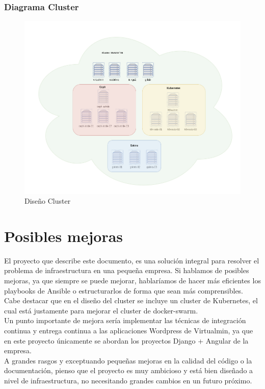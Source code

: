 \begin{paragraph}
		\subsubsection{Diagrama Cluster}
			\begin{figure}[!hbt]
				\centering
				\includegraphics[scale=0.39]{imagenes/Diseno/diagrama_cluster_2.png}
				\caption[Diseño Cluster]{Diseño Cluster} 
				\label{cluster_design}
			\end{figure}
		
	\end{paragraph}
		
\section{Posibles mejoras}
	\begin{paragraph}
		El proyecto que describe este documento, es una solución integral para resolver el problema de infraestructura en una pequeña empresa. Si hablamos de posibles mejoras, ya que siempre se puede mejorar, hablaríamos de hacer más eficientes los playbooks de Ansible o estructurarlos de forma que sean más comprensibles. Cabe destacar que en el diseño del cluster se incluye un cluster de Kubernetes, el cual está justamente para mejorar el cluster de docker-swarm. \\
		Un punto importante de mejora sería implementar las técnicas de integración continua y entrega continua a las aplicaciones Wordpress de Virtualmin, ya que en este proyecto únicamente se abordan los proyectos Django + Angular de la empresa. \\
		A grandes rasgos y exceptuando pequeñas mejoras en la calidad del código o la documentación, pienso que el proyecto es muy ambicioso y está bien diseñado a nivel de infraestructura, no necesitando grandes cambios en un futuro próximo.
	\end{paragraph}